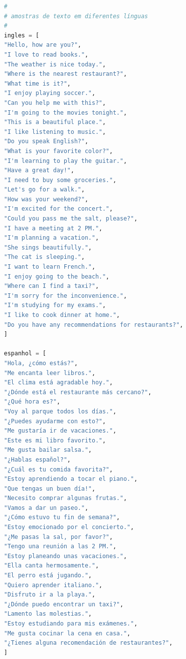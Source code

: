 \begin{lstlisting}[language=Python, style=input]
#
# amostras de texto em diferentes línguas
#
ingles = [
"Hello, how are you?",
"I love to read books.",
"The weather is nice today.",
"Where is the nearest restaurant?",
"What time is it?",
"I enjoy playing soccer.",
"Can you help me with this?",
"I'm going to the movies tonight.",
"This is a beautiful place.",
"I like listening to music.",
"Do you speak English?",
"What is your favorite color?",
"I'm learning to play the guitar.",
"Have a great day!",
"I need to buy some groceries.",
"Let's go for a walk.",
"How was your weekend?",
"I'm excited for the concert.",
"Could you pass me the salt, please?",
"I have a meeting at 2 PM.",
"I'm planning a vacation.",
"She sings beautifully.",
"The cat is sleeping.",
"I want to learn French.",
"I enjoy going to the beach.",
"Where can I find a taxi?",
"I'm sorry for the inconvenience.",
"I'm studying for my exams.",
"I like to cook dinner at home.",
"Do you have any recommendations for restaurants?",
]

espanhol = [
"Hola, ¿cómo estás?",
"Me encanta leer libros.",
"El clima está agradable hoy.",
"¿Dónde está el restaurante más cercano?",
"¿Qué hora es?",
"Voy al parque todos los días.",
"¿Puedes ayudarme con esto?",
"Me gustaría ir de vacaciones.",
"Este es mi libro favorito.",
"Me gusta bailar salsa.",
"¿Hablas español?",
"¿Cuál es tu comida favorita?",
"Estoy aprendiendo a tocar el piano.",
"Que tengas un buen día!",
"Necesito comprar algunas frutas.",
"Vamos a dar un paseo.",
"¿Cómo estuvo tu fin de semana?",
"Estoy emocionado por el concierto.",
"¿Me pasas la sal, por favor?",
"Tengo una reunión a las 2 PM.",
"Estoy planeando unas vacaciones.",
"Ella canta hermosamente.",
"El perro está jugando.",
"Quiero aprender italiano.",
"Disfruto ir a la playa.",
"¿Dónde puedo encontrar un taxi?",
"Lamento las molestias.",
"Estoy estudiando para mis exámenes.",
"Me gusta cocinar la cena en casa.",
"¿Tienes alguna recomendación de restaurantes?",
]


\end{lstlisting}
